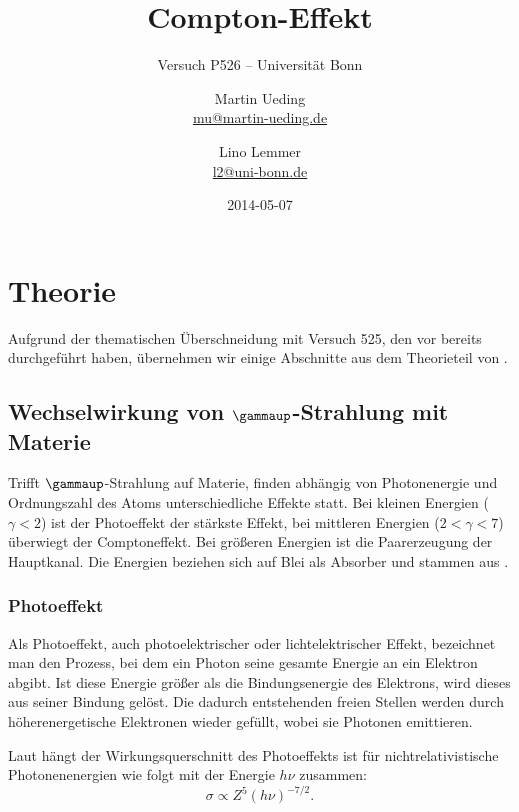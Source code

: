 \documentclass[11pt, ngerman, fleqn, DIV=15, headinclude, BCOR=2cm]{scrreprt}
\title{Compton-Effekt}
\subtitle{Versuch P526 -- Universität Bonn}
\author{
    Martin Ueding \\ \small{\href{mailto:mu@martin-ueding.de}{mu@martin-ueding.de}}
    \and
    Lino Lemmer \\
    \small{\href{mailto:l2@uni-bonn.de}{l2@uni-bonn.de}}
}
\date{2014-05-07}
\begin{document}
\maketitle

\begin{abstract}
\end{abstract}

\tableofcontents

\chapter{Theorie}

Aufgrund der thematischen Überschneidung mit Versuch 525, den vor bereits
durchgeführt haben, übernehmen wir einige Abschnitte aus dem Theorieteil von
\parencite{Ueding/525}.

\section{Wechselwirkung von $\gammaup$-Strahlung mit Materie}
\label{sec:WW}

Trifft $\gammaup$-Strahlung auf Materie, finden abhängig von Photonenergie und
Ordnungszahl des Atoms unterschiedliche Effekte statt. Bei kleinen Energien
($\gamma < 2$) ist der Photoeffekt der stärkste Effekt, bei mittleren Energien
($2 < \gamma < 7$) überwiegt der Comptoneffekt. Bei größeren Energien ist die
Paarerzeugung der Hauptkanal. Die Energien beziehen sich auf Blei als Absorber
und stammen aus \parencite[Abbildung~17.31]{meschede-gerthsen_24}.

\subsection{Photoeffekt}

Als Photoeffekt, auch photoelektrischer oder lichtelektrischer Effekt,
bezeichnet man den Prozess, bei dem ein Photon seine gesamte Energie an ein
Elektron abgibt. Ist diese Energie größer als die Bindungsenergie des
Elektrons, wird dieses aus seiner Bindung gelöst. Die dadurch entstehenden
freien Stellen werden durch höherenergetische Elektronen wieder gefüllt, wobei
sie Photonen emittieren.

Laut \parencite[(2,103)]{Leo/Techniques_Nuclear_Experiments} hängt der
Wirkungsquerschnitt des Photoeffekts ist für nichtrelativistische
Photonenenergien wie folgt mit der Energie $h\nu$ zusammen:
\[
    \sigma \propto Z^5 (h\nu)^{-7/2}.
\]
\end{document}
